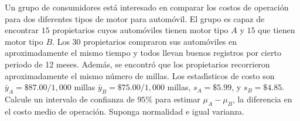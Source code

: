 \begin{enunciado}
 Un grupo de consumidores est\'a interesado en comparar los costos de operaci\'on para dos diferentes tipos de motor para autom\'ovil. El grupo es capaz de encontrar $15$ propietarios cuyos autom\'oviles tienen motor tipo $A$ y $15$ que tienen motor tipo $B$. Los $30$ propietarios compraron sus autom\'oviles en aproximadamente el mismo tiempo y todos llevan buenos registros por cierto periodo de 12 meses. Adem\'as, se encontr\'o que los propietarios recorrieron aproximadamente el mismo n\'umero de millas. Los estad\'{\i}sticos de costo son $\bar{y}_A = \$87.00/1,000$ millas $\bar{y}_B = \$75.00/1,000$ millas, $s_A = \$5.99$, y $s_B = \$4.85$. Calcule un intervalo de confianza de $95\%$ para estimar $\mu_A - \mu_B$, la diferencia en el costo medio de operaci\'on. Suponga normalidad e igual varianza.
\end{enunciado}

